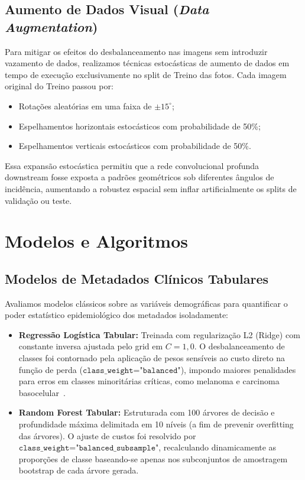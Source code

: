 \documentclass[10pt,twocolumn,letterpaper]{article}
\begin{document}
\subsection{Aumento de Dados Visual (\emph{Data Augmentation})}
Para mitigar os efeitos do desbalanceamento nas imagens sem introduzir vazamento de dados, realizamos técnicas estocásticas de aumento de dados em tempo de execução exclusivamente no split de Treino das fotos. Cada imagem original do Treino passou por:
\begin{itemize}
    \item Rotações aleatórias em uma faixa de $\pm 15^\circ$;
    \item Espelhamentos horizontais estocásticos com probabilidade de 50\%;
    \item Espelhamentos verticais estocásticos com probabilidade de 50\%.
\end{itemize}
Essa expansão estocástica permitiu que a rede convolucional profunda downstream fosse exposta a padrões geométricos sob diferentes ângulos de incidência, aumentando a robustez espacial sem inflar artificialmente os splits de validação ou teste.

\section{Modelos e Algoritmos}
\label{sec:modelos}

\subsection{Modelos de Metadados Clínicos Tabulares}
Avaliamos modelos clássicos sobre as variáveis demográficas para quantificar o poder estatístico epidemiológico dos metadados isoladamente:
\begin{itemize}
    \item \textbf{Regressão Logística Tabular:} Treinada com regularização L2 (Ridge) com constante inversa ajustada pelo grid em $C=1,0$. O desbalanceamento de classes foi contornado pela aplicação de pesos sensíveis ao custo direto na função de perda ($\texttt{class\_weight="balanced"}$), impondo maiores penalidades para erros em classes minoritárias críticas, como melanoma e carcinoma basocelular~\cite{elkan2001foundations}.
    \item \textbf{Random Forest Tabular:} Estruturada com 100 árvores de decisão e profundidade máxima delimitada em 10 níveis (a fim de prevenir overfitting das árvores). O ajuste de custos foi resolvido por $\texttt{class\_weight="balanced\_subsample"}$, recalculando dinamicamente as proporções de classe baseando-se apenas nos subconjuntos de amostragem bootstrap de cada árvore gerada.
\end{itemize}
\end{document}
